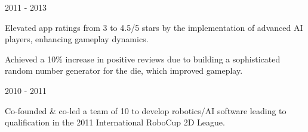 \begin{cventries}
    


  \cventrythin
    {} %
    {2011 - 2013} %
    {
          \begin{cvitems} %
	          	\item {Elevated app ratings from 3 to 4.5/5 stars by the implementation of advanced AI players, enhancing gameplay dynamics.}
				\item {Achieved a 10\% increase in positive reviews due to building a sophisticated random number generator for the die, which improved gameplay.}
	      \end{cvitems}
    }
    
    



  \cventrythin
    {} %
    {2010 - 2011} %
    {
          \begin{cvitems} %
			\item {Co-founded \& co-led a team of 10 to develop robotics/AI software leading to qualification in the 2011 International RoboCup 2D League.}%
	      \end{cvitems}
    }
    
    

\end{cventries}
